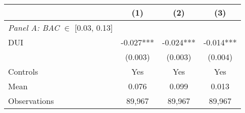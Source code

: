{
\def\sym#1{\ifmmode^{#1}\else\(^{#1}\)\fi}
\begin{tabular*}{0.7\hsize}{@{\hskip\tabcolsep\extracolsep\fill}l*{3}{c}}
\toprule
               &\multicolumn{1}{c}{(1)}&\multicolumn{1}{c}{(2)}&\multicolumn{1}{c}{(3)}\\
\midrule
\textit{Panel A: BAC} $\in$ [0.03, 0.13]&               &               &               \\
\addlinespace
DUI            &      -0.027***&      -0.024***&      -0.014***\\
               &     (0.003)   &     (0.003)   &     (0.004)   \\
\addlinespace
Controls       &         Yes   &         Yes   &         Yes   \\

Mean           &       0.076   &       0.099   &       0.013   \\
Observations   &      89,967   &      89,967   &      89,967   \\
\end{tabular*}}

